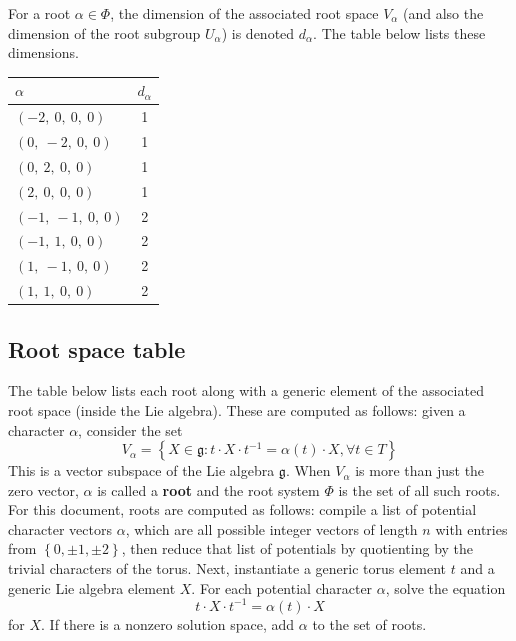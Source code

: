 \documentclass[11pt]{article}
\newcommand{\noi}{\noindent}
\newcommand{\tbf}{\textbf}
\newcommand{\inv}{^{-1}}
\newcommand{\lb}{\left\{}
\newcommand{\rb}{\right\}}
\newcommand{\frakg}{\mathfrak{g}}
\theoremstyle{definition}
\begin{document}
For a root $\alpha \in \Phi$, the dimension of the associated root space $V_\alpha$ (and also the dimension of the root subgroup $U_\alpha$) is denoted $d_\alpha$. The table below lists these dimensions.

\bigskip

\noindent \begin{tabular}{|l|c|}
    \hline
    \textbf{$\alpha$} & \textbf{$d_{\alpha}$} \\
    \hline
    $\left( -2, \  0, \  0, \  0\right)$ & 1 \\
    \hline
    $\left( 0, \  -2, \  0, \  0\right)$ & 1 \\
    \hline
    $\left( 0, \  2, \  0, \  0\right)$ & 1 \\
    \hline
    $\left( 2, \  0, \  0, \  0\right)$ & 1 \\
    \hline
    $\left( -1, \  -1, \  0, \  0\right)$ & 2 \\
    \hline
    $\left( -1, \  1, \  0, \  0\right)$ & 2 \\
    \hline
    $\left( 1, \  -1, \  0, \  0\right)$ & 2 \\
    \hline
    $\left( 1, \  1, \  0, \  0\right)$ & 2 \\
    \hline
\end{tabular}


\subsection{Root space table}

\noi The table below lists each root along with a generic element of the associated root space (inside the Lie algebra). These are computed as follows: given a character $\alpha$, consider the set
\[
	V_\alpha = \lb X \in \frakg : t \cdot X \cdot t \inv = \alpha(t) \cdot X, \forall t \in T \rb
\]
This is a vector subspace of the Lie algebra $\frakg$. When $V_\alpha$ is more than just the zero vector, $\alpha$ is called a \tbf{root} and the root system $\Phi$ is the set of all such roots. For this document, roots are computed as follows: compile a list of potential character vectors $\alpha$, which are all possible integer vectors of length $n$ with entries from $\lb 0, \pm 1, \pm 2 \rb$, then reduce that list of potentials by quotienting by the trivial characters of the torus. Next, instantiate a generic torus element $t$ and a generic Lie algebra element $X$. For each potential character $\alpha$, solve the equation
\[
	t \cdot X \cdot t \inv = \alpha(t) \cdot X
\]
for $X$. If there is a nonzero solution space, add $\alpha$ to the set of roots.
\end{document}
